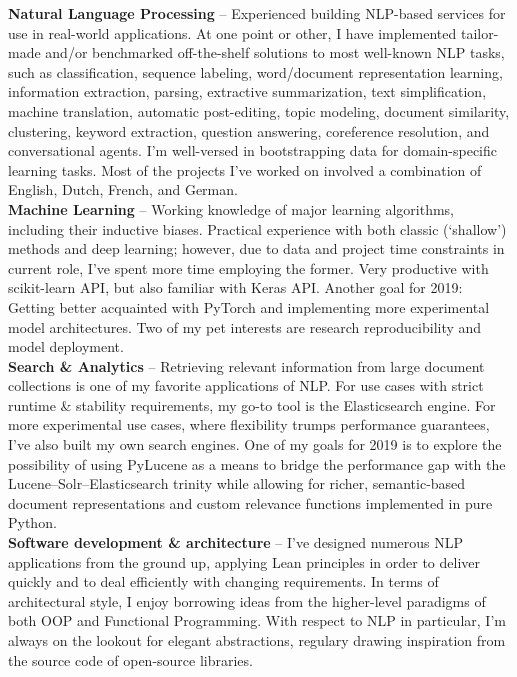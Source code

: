 \documentclass[9pt]{developercv} %
\begin{document}
\textbf{Natural Language Processing} -- Experienced building NLP-based services
for use in real-world applications. At one point or other, I have implemented
tailor-made and/or benchmarked off-the-shelf solutions to most well-known NLP
tasks, such as classification, sequence labeling, word/document representation
learning, information extraction, parsing, extractive summarization, text
simplification, machine translation, automatic post-editing, topic modeling,
document similarity, clustering, keyword extraction, question answering,
coreference resolution, and conversational agents. I'm well-versed in
bootstrapping data for domain-specific learning tasks. Most of the projects
I've worked on involved a combination of English, Dutch, French, and German.\\ 

\textbf{Machine Learning} -- Working knowledge of major learning algorithms,
including their inductive biases. Practical experience with both classic
(`shallow') methods and deep learning; however, due to data and project time
constraints in current role, I've spent more time employing the former. Very
productive with scikit-learn API, but also familiar with Keras API. Another
goal for 2019: Getting better acquainted with PyTorch and implementing more
experimental model architectures.  Two of my pet interests are research
reproducibility and model deployment.\\

\textbf{Search \& Analytics} -- Retrieving relevant information from large
document collections is one of my favorite applications of NLP. For use cases
with strict runtime \& stability requirements, my go-to tool is the
Elasticsearch engine. For more experimental use cases, where flexibility trumps
performance guarantees, I've also built my own search engines. One of my goals
for 2019 is to explore the possibility of using PyLucene as a means to bridge
the performance gap with the Lucene--Solr--Elasticsearch trinity while allowing
for richer, semantic-based document representations and custom relevance
functions implemented in pure Python.\\

\textbf{Software development \& architecture} -- I've designed numerous NLP
applications from the ground up, applying Lean principles in order to deliver
quickly and to deal efficiently with changing requirements. In terms of
architectural style, I enjoy borrowing ideas from the higher-level paradigms of
both OOP and Functional Programming. With respect to NLP in particular, I'm
always on the lookout for elegant abstractions, regulary drawing
inspiration from the source code of open-source libraries.\\
\end{document}
